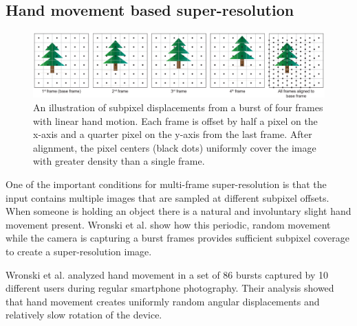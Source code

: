 \documentclass{sig-alternate}
\begin{document}
\subsection{Hand movement based super-resolution}

\begin{figure}
\centering
\includegraphics[width=7in]{Wronski2019-figure-4}
\caption{An illustration of subpixel displacements from a burst of four frames with linear hand motion. Each frame is offset by half a pixel on the x-axis and a quarter pixel on the y-axis from the last frame. After alignment, the pixel centers (black dots) uniformly cover the image with greater density than a single frame.~\cite{Wronski2019}}
\label{fig:Wronski2019Fig4}



\end{figure}

One of the important conditions for multi-frame super-resolution is that the input contains multiple images that are sampled at different subpixel offsets. When someone is holding an object there is a natural and involuntary slight hand movement present. Wronski et al. show how this periodic, random movement while the camera is capturing a burst frames provides sufficient subpixel coverage to create a super-resolution image.

Wronski et al. analyzed hand movement in a set of 86 bursts captured by 10 different users during regular smartphone photography.
Their analysis showed that hand movement creates uniformly random angular displacements and relatively slow rotation of the device.
\end{document}
